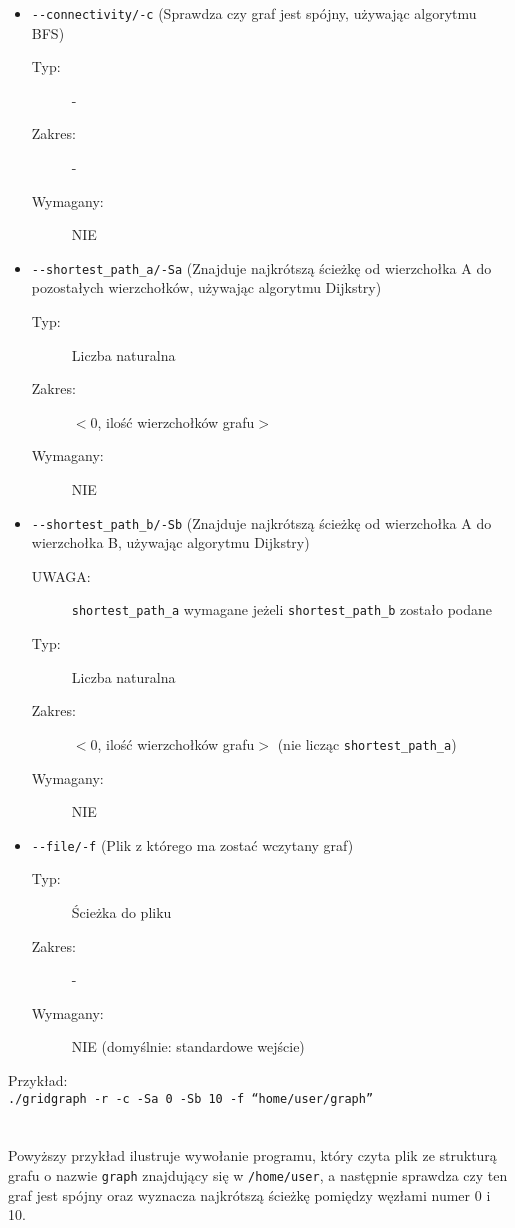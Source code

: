 \documentclass[11pt,a4paper]{report}
\begin{document}
    \begin{itemize}
        \item \verb|--connectivity/-c| (Sprawdza czy graf jest spójny, używając algorytmu BFS)
        \begin{description}
            \item[Typ:] -
            \item[Zakres:] -
            \item[Wymagany:] NIE\footnotemark
        \end{description}
        \item \verb|--shortest_path_a/-Sa| (Znajduje najkrótszą ścieżkę od wierzchołka A do pozostałych wierzchołków, używając algorytmu Dijkstry)
        \begin{description}
            \item[Typ:] Liczba naturalna
            \item[Zakres:] $<$0, ilość wierzchołków grafu$>$
            \item[Wymagany:] NIE\footnotemark[\value{footnote}]
        \end{description}
        \item \verb|--shortest_path_b/-Sb| (Znajduje najkrótszą ścieżkę od wierzchołka A do wierzchołka B, używając algorytmu Dijkstry)
        \begin{description}
            \item[UWAGA:] \verb|shortest_path_a| wymagane jeżeli \verb|shortest_path_b| zostało podane
            \item[Typ:] Liczba naturalna
            \item[Zakres:] $<$0, ilość wierzchołków grafu$>$ (nie licząc \verb|shortest_path_a|)
            \item[Wymagany:] NIE\footnotemark[\value{footnote}]
        \end{description}
        \item \verb|--file/-f| (Plik z którego ma zostać wczytany graf)
        \begin{description}
            \item[Typ:] Ścieżka do pliku
            \item[Zakres:] -
            \item[Wymagany:] NIE (domyślnie: standardowe wejście)
        \end{description}
    \end{itemize}
    Przykład:\\
    \verb|./gridgraph -r -c -Sa 0 -Sb 10 -f “home/user/graph”|\\
    \\
    \\
    Powyższy przykład ilustruje wywołanie programu, który czyta plik ze strukturą grafu o nazwie \verb|graph| znajdujący się w \verb|/home/user|, a następnie sprawdza czy ten graf jest spójny oraz wyznacza najkrótszą ścieżkę pomiędzy węzłami numer 0 i 10.
\end{document}
